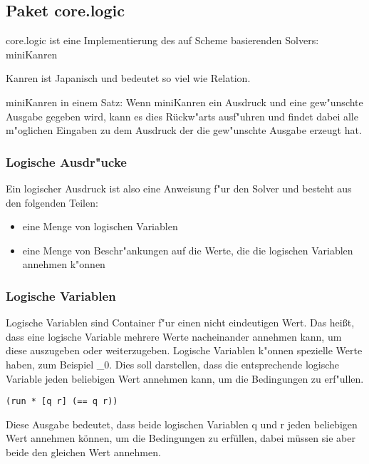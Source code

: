 
\subsection{Paket core.logic}

core.logic ist eine Implementierung des auf Scheme basierenden Solvers: miniKanren

Kanren ist Japanisch und bedeutet so viel wie Relation.

miniKanren in einem Satz: Wenn miniKanren ein Ausdruck und eine gew"unschte Ausgabe gegeben wird, kann es dies \dq{}Rückw"arts\dq{} ausf"uhren und findet dabei alle m"oglichen Eingaben zu dem Ausdruck der die gew"unschte Ausgabe erzeugt hat.

\subsubsection{Logische Ausdr"ucke}

Ein logischer Ausdruck ist also eine Anweisung f"ur den Solver und besteht aus den folgenden Teilen:
\begin{itemize}

\item eine Menge von logischen Variablen

\item eine Menge von Beschr"ankungen auf die Werte, die die logischen Variablen annehmen k"onnen

\end{itemize}


\subsubsection{Logische Variablen}
Logische Variablen sind Container f"ur einen nicht eindeutigen Wert. Das hei\ss{}t, dass eine logische Variable mehrere Werte nacheinander annehmen kann, um diese auszugeben oder weiterzugeben.
Logische Variablen k"onnen spezielle Werte haben, zum Beispiel \_0. Dies soll darstellen, dass die entsprechende logische Variable jeden beliebigen Wert annehmen kann, um die Bedingungen zu erf"ullen.

\begin{lstlisting}
(run * [q r] (== q r))
\end{lstlisting}
\begin{flushleft}
\end{flushleft}
Diese Ausgabe bedeutet, dass beide logischen Variablen q und r jeden beliebigen Wert annehmen können, um die Bedingungen zu erfüllen, dabei müssen sie aber beide den gleichen Wert annehmen.

